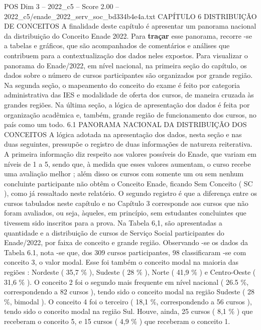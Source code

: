 \begin{textsample}{POS Dim 3 – 2022\_c5 – Score 2.00 – 2022\_c5/enade\_2022\_serv\_soc\_bd334b4e4a.txt}  \label{ex:f3_pos_069}
CAPÍTULO 6 DISTRIBUIÇÃO DE CONCEITOS A finalidade deste capítulo é apresentar um panorama nacional da distribuição do Conceito Enade 2022.
Para \textbf{traçar} esse panorama, recorre -se a tabelas e gráficos, que são acompanhados de comentários e análises que contribuem para a contextualização dos dados neles expostos.
Para visualizar o panorama do Enade/2022, em nível nacional, na primeira seção do capítulo, os dados sobre o número de cursos participantes são organizados por grande região.
Na segunda seção, o mapeamento do conceito do exame é feito por categoria administrativa das IES e modalidade de oferta dos cursos, de maneira cruzada às grandes regiões.
Na última seção, a lógica de apresentação dos dados é feita por organização acadêmica e, também, grande região de funcionamento dos cursos, no país como um todo. 6.1 PANORAMA NACIONAL DA DISTRIBUIÇÃO DOS CONCEITOS A lógica adotada na apresentação dos dados, nesta seção e nas duas seguintes, pressupõe o registro de duas informações de natureza reiterativa.
A primeira informação diz respeito aos valores possíveis do Enade, que variam em níveis de 1 a 5, sendo que, à medida que esses valores aumentam, o curso recebe uma avaliação melhor ; além disso os cursos com somente um ou sem nenhum concluinte participante não obtêm o Conceito Enade, ficando Sem Conceito ( SC ), como já ressaltado neste relatório.
O segundo registro é que a diferença entre os cursos tabulados neste capítulo e no Capítulo 3 corresponde aos cursos que não foram avaliados, ou seja, àqueles, em princípio, sem estudantes concluintes que tivessem sido inscritos para a prova.
Na Tabela 6,1, são apresentadas a quantidade e a distribuição de cursos de Serviço Social participantes do Enade/2022, por faixa de conceito e grande região.
Observando -se os dados da Tabela 6.1, nota -se que, dos 309 cursos participantes, 98 classificaram -se com conceito 3, o valor modal.
Esse foi também o conceito modal na maioria das regiões : Nordeste ( 35,7 \% ), Sudeste ( 28 \% ), Norte ( 41,9 \% ) e Centro-Oeste ( 31,6 \% ).
O conceito 2 foi o segundo mais frequente em nível nacional ( 26.5 \%, correspondendo a 82 cursos ), tendo sido o conceito modal na região Sudeste ( 28 \%, bimodal ).
O conceito 4 foi o terceiro ( 18,1 \%, correspondendo a 56 cursos ), tendo sido o conceito modal na região Sul.
Houve, ainda, 25 cursos ( 8,1 \% ) que receberam o conceito 5, e 15 cursos ( 4,9 \% ) que receberam o conceito 1.

\end{textsample}

